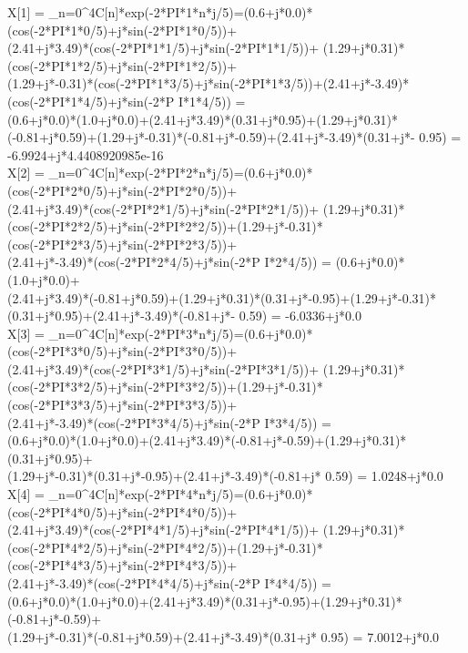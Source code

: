 \documentclass[landscape,12pt]{article}
\begin{document}
X[1] = \sum_{n=0}^{4}{C[n]*exp(-2*PI*1*n*j/5)}=(0.6+j*0.0)*(cos(-2*PI*1*0/5)+j*sin(-2*PI*1*0/5))+\\(2.41+j*3.49)*(cos(-2*PI*1*1/5)+j*sin(-2*PI*1*1/5))+
(1.29+j*0.31)*(cos(-2*PI*1*2/5)+j*sin(-2*PI*1*2/5))+\\(1.29+j*-0.31)*(cos(-2*PI*1*3/5)+j*sin(-2*PI*1*3/5))+(2.41+j*-3.49)*(cos(-2*PI*1*4/5)+j*sin(-2*P
I*1*4/5)) = \\(0.6+j*0.0)*(1.0+j*0.0)+(2.41+j*3.49)*(0.31+j*0.95)+(1.29+j*0.31)*(-0.81+j*0.59)+(1.29+j*-0.31)*(-0.81+j*-0.59)+(2.41+j*-3.49)*(0.31+j*-
0.95) = -6.9924+j*4.4408920985e-16\\

X[2] = \sum_{n=0}^{4}{C[n]*exp(-2*PI*2*n*j/5)}=(0.6+j*0.0)*(cos(-2*PI*2*0/5)+j*sin(-2*PI*2*0/5))+\\(2.41+j*3.49)*(cos(-2*PI*2*1/5)+j*sin(-2*PI*2*1/5))+
(1.29+j*0.31)*(cos(-2*PI*2*2/5)+j*sin(-2*PI*2*2/5))+(1.29+j*-0.31)*(cos(-2*PI*2*3/5)+j*sin(-2*PI*2*3/5))+\\(2.41+j*-3.49)*(cos(-2*PI*2*4/5)+j*sin(-2*P
I*2*4/5)) = (0.6+j*0.0)*(1.0+j*0.0)+\\(2.41+j*3.49)*(-0.81+j*0.59)+(1.29+j*0.31)*(0.31+j*-0.95)+(1.29+j*-0.31)*(0.31+j*0.95)+(2.41+j*-3.49)*(-0.81+j*-
0.59) = -6.0336+j*0.0\\

X[3] = \sum_{n=0}^{4}{C[n]*exp(-2*PI*3*n*j/5)}=(0.6+j*0.0)*(cos(-2*PI*3*0/5)+j*sin(-2*PI*3*0/5))+\\(2.41+j*3.49)*(cos(-2*PI*3*1/5)+j*sin(-2*PI*3*1/5))+
(1.29+j*0.31)*(cos(-2*PI*3*2/5)+j*sin(-2*PI*3*2/5))+(1.29+j*-0.31)*(cos(-2*PI*3*3/5)+j*sin(-2*PI*3*3/5))+\\(2.41+j*-3.49)*(cos(-2*PI*3*4/5)+j*sin(-2*P
I*3*4/5)) =\\ (0.6+j*0.0)*(1.0+j*0.0)+(2.41+j*3.49)*(-0.81+j*-0.59)+(1.29+j*0.31)*(0.31+j*0.95)+\\(1.29+j*-0.31)*(0.31+j*-0.95)+(2.41+j*-3.49)*(-0.81+j*
0.59) = 1.0248+j*0.0\\

X[4] = \sum_{n=0}^{4}{C[n]*exp(-2*PI*4*n*j/5)}=(0.6+j*0.0)*(cos(-2*PI*4*0/5)+j*sin(-2*PI*4*0/5))+\\(2.41+j*3.49)*(cos(-2*PI*4*1/5)+j*sin(-2*PI*4*1/5))+
(1.29+j*0.31)*(cos(-2*PI*4*2/5)+j*sin(-2*PI*4*2/5))+(1.29+j*-0.31)*(cos(-2*PI*4*3/5)+j*sin(-2*PI*4*3/5))+\\(2.41+j*-3.49)*(cos(-2*PI*4*4/5)+j*sin(-2*P
I*4*4/5)) = \\(0.6+j*0.0)*(1.0+j*0.0)+(2.41+j*3.49)*(0.31+j*-0.95)+(1.29+j*0.31)*(-0.81+j*-0.59)+\\(1.29+j*-0.31)*(-0.81+j*0.59)+(2.41+j*-3.49)*(0.31+j*
0.95) = 7.0012+j*0.0\\
\end{document}
